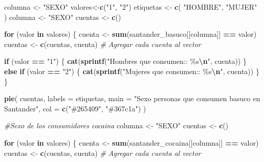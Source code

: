 \documentclass[
]{article}
\newenvironment{Shaded}{\begin{snugshade}}{\end{snugshade}}
\newcommand{\AttributeTok}[1]{\textcolor[rgb]{0.13,0.29,0.53}{#1}}
\newcommand{\CommentTok}[1]{\textcolor[rgb]{0.56,0.35,0.01}{\textit{#1}}}
\newcommand{\ControlFlowTok}[1]{\textcolor[rgb]{0.13,0.29,0.53}{\textbf{#1}}}
\newcommand{\FunctionTok}[1]{\textcolor[rgb]{0.13,0.29,0.53}{\textbf{#1}}}
\newcommand{\NormalTok}[1]{#1}
\newcommand{\OtherTok}[1]{\textcolor[rgb]{0.56,0.35,0.01}{#1}}
\newcommand{\SpecialCharTok}[1]{\textcolor[rgb]{0.81,0.36,0.00}{\textbf{#1}}}
\newcommand{\StringTok}[1]{\textcolor[rgb]{0.31,0.60,0.02}{#1}}
\begin{document}
\begin{Shaded}
\begin{Highlighting}[]

\NormalTok{columna }\OtherTok{\textless{}{-}} \StringTok{"SEXO"}
\NormalTok{valores}\OtherTok{\textless{}{-}}\FunctionTok{c}\NormalTok{(}\StringTok{"1"}\NormalTok{, }\StringTok{"2"}\NormalTok{)}
\NormalTok{etiquetas }\OtherTok{\textless{}{-}} \FunctionTok{c}\NormalTok{(}
  \StringTok{"HOMBRE"}\NormalTok{,}
  \StringTok{"MUJER"}
\NormalTok{)}
\NormalTok{columna }\OtherTok{\textless{}{-}} \StringTok{"SEXO"}
\NormalTok{cuentas }\OtherTok{\textless{}{-}} \FunctionTok{c}\NormalTok{()}

\ControlFlowTok{for}\NormalTok{ (valor }\ControlFlowTok{in}\NormalTok{ valores) \{}
\NormalTok{  cuenta }\OtherTok{\textless{}{-}} \FunctionTok{sum}\NormalTok{(santander\_basuco[[columna]] }\SpecialCharTok{==}\NormalTok{ valor)}
\NormalTok{  cuentas }\OtherTok{\textless{}{-}} \FunctionTok{c}\NormalTok{(cuentas, cuenta)  }\CommentTok{\# Agregar cada cuenta al vector}
  
  \ControlFlowTok{if}\NormalTok{ (valor }\SpecialCharTok{==} \StringTok{"1"}\NormalTok{) \{}
    \FunctionTok{cat}\NormalTok{(}\FunctionTok{sprintf}\NormalTok{(}\StringTok{"Hombres que consumen:: \%s}\SpecialCharTok{\textbackslash{}n}\StringTok{"}\NormalTok{, cuenta))}
\NormalTok{  \} }\ControlFlowTok{else} \ControlFlowTok{if}\NormalTok{ (valor }\SpecialCharTok{==} \StringTok{"2"}\NormalTok{) \{}
    \FunctionTok{cat}\NormalTok{(}\FunctionTok{sprintf}\NormalTok{(}\StringTok{"Mujeres que consumen:: \%s}\SpecialCharTok{\textbackslash{}n}\StringTok{"}\NormalTok{, cuenta))}
\NormalTok{  \}}
\NormalTok{\}}

\FunctionTok{pie}\NormalTok{(}
\NormalTok{  cuentas,}
  \AttributeTok{labels =}\NormalTok{ etiquetas,}
  \AttributeTok{main =} \StringTok{"Sexo personas que consumen basuco  en Santander"}\NormalTok{,}
  \AttributeTok{col =} \FunctionTok{c}\NormalTok{(}\StringTok{"\#265409"}\NormalTok{, }\StringTok{"\#367c1a"}\NormalTok{)}
\NormalTok{)}

\CommentTok{\#Sexo de los consumidores cocaina }
\NormalTok{columna }\OtherTok{\textless{}{-}} \StringTok{"SEXO"}
\NormalTok{cuentas }\OtherTok{\textless{}{-}} \FunctionTok{c}\NormalTok{()}

\ControlFlowTok{for}\NormalTok{ (valor }\ControlFlowTok{in}\NormalTok{ valores) \{}
\NormalTok{  cuenta }\OtherTok{\textless{}{-}} \FunctionTok{sum}\NormalTok{(santander\_cocaina[[columna]] }\SpecialCharTok{==}\NormalTok{ valor)}
\NormalTok{  cuentas }\OtherTok{\textless{}{-}} \FunctionTok{c}\NormalTok{(cuentas, cuenta)  }\CommentTok{\# Agregar cada cuenta al vector}
  

\end{Highlighting}
\end{Shaded}
\end{document}
